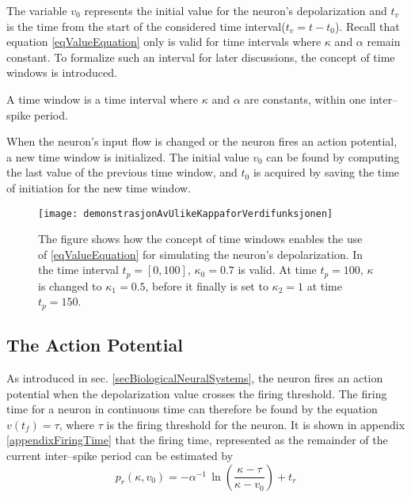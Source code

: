 	
		The variable $v_0$ represents the initial value for the neuron's depolarization and $t_v$ is the time from the start of the considered time interval\mbox{($t_v = t - t_0$)}.
		Recall that equation \ref{eqValueEquation} only is valid for time intervals where $\kappa$ and $\alpha$ remain constant.
		To formalize such an interval for later discussions, the concept of time windows is introduced. %
		\begin{mydef}
			A time window is a time interval where $\kappa$ and $\alpha$ are constants, within one inter--spike period.
			\label{defTimeWindow}
		\end{mydef}
		When the neuron's input flow is changed or the neuron fires an action potential, a new time window is initialized.
		The initial value $v_0$ can be found by computing the last value of the previous time window, and $t_0$ is acquired by saving the time of initiation for the new time window.


\begin{figure}[htb!p]
    \centering
    \texttt{[image: demonstrasjonAvUlikeKappaforVerdifunksjonen]}
 	  \caption[Illustration of how time windows can be utilized to simulated the neuron by the algebraic equation]{
			The figure shows how the concept of time windows enables the use of \eqref{eqValueEquation} for simulating the neuron's depolarization.
			In the time interval $t_p = [0, 100]$, $\kappa_0 = 0.7$ is valid.
			At time $t_p = 100$, $\kappa$ is changed to $\kappa_1 = 0.5$, before it finally is set to $\kappa_2 = 1$ at time $t_p = 150$.
			}
\end{figure}

	\subsection{The Action Potential}
	\label{ssecTheActionPotential}
	As introduced in sec. \ref{secBiologicalNeuralSystems}, the neuron fires an action potential when the depolarization value crosses the firing threshold.
	The firing time for a neuron in continuous time can therefore be found by the equation $v(t_f) = \tau$, where $\tau$ is the firing threshold for the neuron.
	It is shown in appendix \ref{appendixFiringTime} that the firing time, represented as the remainder of the current inter--spike period can be estimated by %
\begin{equation}
	p_r(\kappa, v_0)  	= -\alpha^{-1} \, \ln \left( \frac{\kappa - \tau}{\kappa - v_0} \right) + t_r
	\label{eqEstimatedTimeToFiring}
\end{equation}

